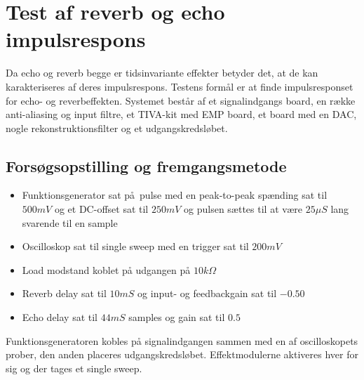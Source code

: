 \chapter{Test af reverb og echo impulsrespons}\label{sec:test_af_effekt}
Da echo og reverb begge er tidsinvariante effekter betyder det, at de kan karakteriseres af deres impulsrespons.\newline
Testens formål er at finde impulsresponset for echo- og reverbeffekten.
Systemet består af et signalindgangs board, en række anti-aliasing og input filtre, et TIVA-kit med EMP board, et board med en DAC, nogle rekonstruktionsfilter og et udgangskredsløbet.
\section{Forsøgsopstilling og fremgangsmetode}
\begin{itemize}
	\item Funktionsgenerator sat på pulse med en peak-to-peak spænding sat til $500\si{mV}$ og et DC-offset sat til $250\si{mV}$ og pulsen sættes til at være $25\si{\mu S}$ lang svarende til en sample
	\item Oscilloskop sat til single sweep med en trigger sat til $200\si{mV}$
	\item Load modstand koblet på udgangen på $10\si{k\Omega}$
	\item Reverb delay sat til $10\si{mS}$ og input- og feedbackgain sat til $-0.50$
	\item Echo delay sat til $44\si{mS}$ samples og gain sat til $0.5$
\end{itemize}
Funktionsgeneratoren kobles på signalindgangen sammen med en af oscilloskopets prober, den anden placeres udgangskredsløbet.\newline
Effektmodulerne aktiveres hver for sig og der tages et single sweep.
